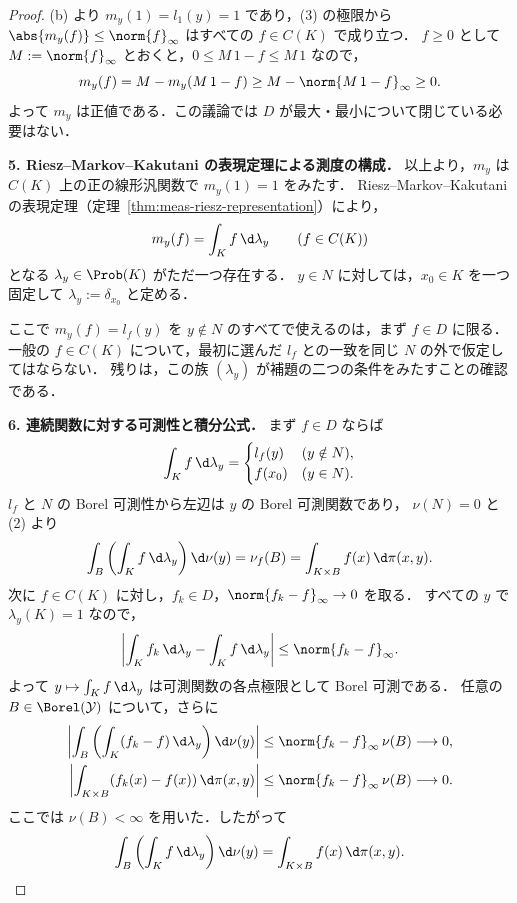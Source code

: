 \begin{proof}
  (b) より $m_y(1)=l_1(y)=1$ であり，(3) の極限から
  $\abs{m_y(f)}\leq\norm{f}_\infty$ はすべての $f\in C(K)$ で成り立つ．
  $f\geq0$ として $M:=\norm{f}_\infty$ とおくと，$0\leq M\,1-f\leq M\,1$ なので，
  \[
    m_y(f)=M-m_y(M\,1-f)\geq M-\norm{M\,1-f}_\infty\geq0.
  \]
  よって $m_y$ は正値である．この議論では $D$ が最大・最小について閉じている必要はない．

  \textbf{5. Riesz--Markov--Kakutani の表現定理による測度の構成．}
  以上より，$m_y$ は $C(K)$ 上の正の線形汎関数で $m_y(1)=1$ をみたす．
  Riesz--Markov--Kakutani の表現定理（定理~\ref{thm:meas-riesz-representation}）により，
  \[
    m_y(f)=\int_{K}f\,\d\lambda_y\qquad(f\in C(K))
  \]
  となる $\lambda_y\in\Prob(K)$ がただ一つ存在する．
  $y\in N$ に対しては，$x_0\in K$ を一つ固定して $\lambda_y:=\delta_{x_0}$ と定める．

  ここで $m_y(f)=l_f(y)$ を $y\notin N$ のすべてで使えるのは，まず $f\in D$ に限る．
  一般の $f\in C(K)$ について，最初に選んだ $l_f$ との一致を同じ $N$ の外で仮定してはならない．
  残りは，この族 $(\lambda_y)$ が補題の二つの条件をみたすことの確認である．

  \textbf{6. 連続関数に対する可測性と積分公式．}
  まず $f\in D$ ならば
  \[
    \int_Kf\,\d\lambda_y=
    \begin{cases}
      l_f(y)&(y\notin N),\\
      f(x_0)&(y\in N).
    \end{cases}
  \]
  $l_f$ と $N$ の Borel 可測性から左辺は $y$ の Borel 可測関数であり，
  $\nu(N)=0$ と (2) より
  \[
    \int_B\left(\int_K f\,\d\lambda_y\right)\d\nu(y)
    =\nu_f(B)=\int_{K\times B}f(x)\,\d\pi(x,y).
  \]
  次に $f\in C(K)$ に対し，$f_k\in D$，$\norm{f_k-f}_\infty\to0$ を取る．
  すべての $y$ で $\lambda_y(K)=1$ なので，
  \[
    \left|\int_K f_k\,\d\lambda_y-\int_Kf\,\d\lambda_y\right|
    \leq\norm{f_k-f}_\infty.
  \]
  よって $y\mapsto\int_Kf\,\d\lambda_y$ は可測関数の各点極限として Borel 可測である．
  任意の $B\in\Borel(\mathcal{Y})$ について，さらに
  \[
    \begin{aligned}
      \left|\int_B\left(\int_K(f_k-f)\,\d\lambda_y\right)\d\nu(y)\right|
      &\leq\norm{f_k-f}_\infty\,\nu(B)\longrightarrow0,\\
      \left|\int_{K\times B}(f_k(x)-f(x))\,\d\pi(x,y)\right|
      &\leq\norm{f_k-f}_\infty\,\nu(B)\longrightarrow0.
    \end{aligned}
  \]
  ここでは $\nu(B)<\infty$ を用いた．したがって
  \[
    \int_B\left(\int_Kf\,\d\lambda_y\right)\d\nu(y)
    =\int_{K\times B}f(x)\,\d\pi(x,y).
  \]


\end{proof}
